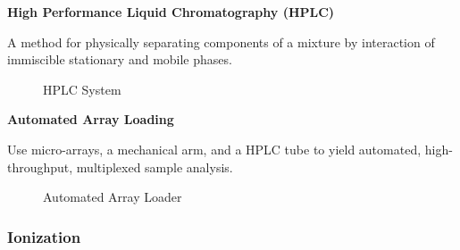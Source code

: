 \documentclass[letterpaper, 10 pt, conference]{ieeeconf}  %
\begin{document}
            \textbf{High Performance Liquid Chromatography (HPLC)}\hfill

            A method for physically separating components of a mixture by interaction of immiscible stationary and mobile phases. 

            \begin{figure}[h]
                \centering
            
                \caption{HPLC System\autocite{R9}}
            \end{figure}


            \textbf{Automated Array Loading} \hfill

            Use micro-arrays, a mechanical arm, and a HPLC tube to yield automated, high-throughput, multiplexed sample analysis.

            \begin{figure}[h]
                \centering
            
                \caption{Automated Array Loader}
            \end{figure}

            \FloatBarrier

        \subsubsection{\textbf{Ionization}}\hfill \hfill
\end{document}
